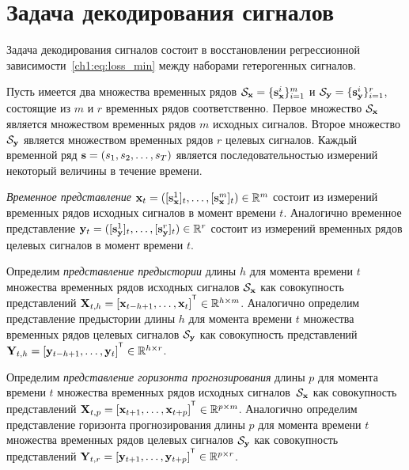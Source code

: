 \section{Задача декодирования сигналов}
\label{sec:ch1:decoding_task}

Задача декодирования сигналов состоит в восстановлении регрессионной зависимости~\eqref{ch1:eq:loss_min} между наборами гетерогенных сигналов.

Пусть имеется два множества временных рядов $\mathcal{S}_{\mathbf{x}} = \{\mathbf{s}_{\mathbf{x}}^i\}_{i=1}^m$ и $\mathcal{S}_{\mathbf{y}} = \{\mathbf{s}_{\mathbf{y}}^i\}_{i=1}^r$, состоящие из $m$ и $r$ временных рядов соответственно. 
Первое множество $\mathcal{S}_{\mathbf{x}}$ является множеством временных рядов $m$ исходных сигналов. 
Второе множество $\mathcal{S}_{\mathbf{y}}$ является множеством временных рядов $r$ целевых сигналов.
Каждый временной ряд $\mathbf{s} = (s_1, s_2, \dots, s_T)$ является последовательностью измерений некоторый величины в течение времени. 
\begin{definition}
	 \textit{Временное представление} $\mathbf{x}_t = ([\mathbf{s}_{\mathbf{x}}^1]_t, \dots, [\mathbf{s}_{\mathbf{x}}^m]_t) \in \mathbb{R}^m$ состоит из измерений временных рядов исходных сигналов в момент времени $t$. 
	Аналогично временное представление $\mathbf{y}_t = ([\mathbf{s}_{\mathbf{y}}^1]_t, \dots, [\mathbf{s}_{\mathbf{y}}^r]_t) \in \mathbb{R}^r$ состоит из измерений временных рядов целевых сигналов в момент времени $t$.
\end{definition}
\begin{definition}
	Определим \textit{представление предыстории} длины $h$ для момента времени $t$ множества временных рядов исходных сигналов $\mathcal{S}_{\mathbf{x}}$ как совокупность представлений $\bX_{t,h} = [\bx_{t - h + 1}, \dots, \bx_{t}]^{\T} \in \bbR^{h \times m}$.
	Аналогично определим представление предыстории длины $h$ для момента времени $t$ множества временных рядов целевых сигналов $\mathcal{S}_{\mathbf{y}}$ как совокупность представлений $\bY_{t,h} = [\by_{t - h + 1}, \dots, \by_{t}]^{\T} \in \bbR^{h \times r}$.
\end{definition}
\begin{definition}
	Определим \textit{представление горизонта прогнозирования} длины $p$ для момента времени $t$ множества временных рядов исходных сигналов~$\mathcal{S}_{\mathbf{x}}$ как совокупность представлений $\bX_{t,p} = [\bx_{t + 1}, \dots, \bx_{t + p}]^{\T} \in \bbR^{p \times m}$.
	Аналогично определим представление горизонта прогнозирования длины $p$ для момента времени $t$ множества временных рядов целевых сигналов $\mathcal{S}_{\mathbf{y}}$ как совокупность представлений $\bY_{t,r} = [\by_{t + 1}, \dots, \by_{t + p}]^{\T} \in \bbR^{p \times r}$.
\end{definition}

